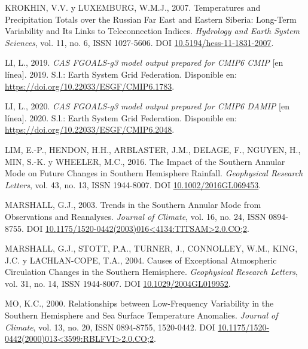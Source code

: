 \documentclass[12pt,oneside,a4paper]{reedthesis}
\newlength{\cslhangindent}
\newenvironment{CSLReferences}[2] %
 {%
  \setlength{\parindent}{0pt}
  \ifodd #1 \everypar{\setlength{\hangindent}{\cslhangindent}}\ignorespaces\fi
  \ifnum #2 > 0
  \setlength{\parskip}{#2\baselineskip}
  \fi
 }%
 {}
\begin{document}
\begin{CSLReferences}{1}{0}
\leavevmode{}%
KROKHIN, V.V. y LUXEMBURG, W.M.J., 2007. Temperatures and Precipitation Totals over the {Russian Far East} and {Eastern Siberia}: Long-Term Variability and Its Links to Teleconnection Indices. \emph{Hydrology and Earth System Sciences}, vol. 11, no. 6, ISSN 1027-5606. DOI \href{https://doi.org/10.5194/hess-11-1831-2007}{10.5194/hess-11-1831-2007}.

\leavevmode{}%
LI, L., 2019. \emph{CAS FGOALS-g3 model output prepared for CMIP6 CMIP} {[}en línea{]}. 2019. S.l.: Earth System Grid Federation. Disponible en: \url{https://doi.org/10.22033/ESGF/CMIP6.1783}.

\leavevmode{}%
LI, L., 2020. \emph{CAS FGOALS-g3 model output prepared for CMIP6 DAMIP} {[}en línea{]}. 2020. S.l.: Earth System Grid Federation. Disponible en: \url{https://doi.org/10.22033/ESGF/CMIP6.2048}.

\leavevmode{}%
LIM, E.-P., HENDON, H.H., ARBLASTER, J.M., DELAGE, F., NGUYEN, H., MIN, S.-K. y WHEELER, M.C., 2016. The Impact of the {Southern Annular Mode} on Future Changes in {Southern Hemisphere} Rainfall. \emph{Geophysical Research Letters}, vol. 43, no. 13, ISSN 1944-8007. DOI \href{https://doi.org/10.1002/2016GL069453}{10.1002/2016GL069453}.

\leavevmode{}%
MARSHALL, G.J., 2003. Trends in the {Southern Annular Mode} from {Observations} and {Reanalyses}. \emph{Journal of Climate}, vol. 16, no. 24, ISSN 0894-8755. DOI \href{https://doi.org/10.1175/1520-0442(2003)016\%3C4134:TITSAM\%3E2.0.CO;2}{10.1175/1520-0442(2003)016\textless4134:TITSAM\textgreater2.0.CO;2}.

\leavevmode{}%
MARSHALL, G.J., STOTT, P.A., TURNER, J., CONNOLLEY, W.M., KING, J.C. y LACHLAN-COPE, T.A., 2004. Causes of Exceptional Atmospheric Circulation Changes in the {Southern Hemisphere}. \emph{Geophysical Research Letters}, vol. 31, no. 14, ISSN 1944-8007. DOI \href{https://doi.org/10.1029/2004GL019952}{10.1029/2004GL019952}.

\leavevmode{}%
MO, K.C., 2000. Relationships between {Low-Frequency Variability} in the {Southern Hemisphere} and {Sea Surface Temperature Anomalies}. \emph{Journal of Climate}, vol. 13, no. 20, ISSN 0894-8755, 1520-0442. DOI \href{https://doi.org/10.1175/1520-0442(2000)013\%3C3599:RBLFVI\%3E2.0.CO;2}{10.1175/1520-0442(2000)013\textless3599:RBLFVI\textgreater2.0.CO;2}.


\end{CSLReferences}
\end{document}
